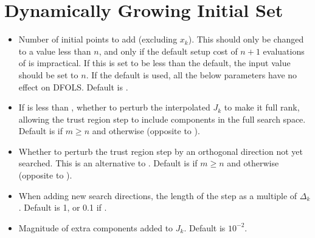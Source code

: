\documentclass[letterpaper,10pt,english]{sphinxmanual}
\begin{document}
\section{Dynamically Growing Initial Set}
\label{\detokenize{advanced:dynamically-growing-initial-set}}\begin{itemize}
\item {} 
 \sphinxhyphen{} Number of initial points to add (excluding \(x_k\)). This should only be changed to a value less than \(n\), and only if the default setup cost of \(n+1\) evaluations of  is impractical. If this is set to be less than the default, the input value  should be set to \(n\). If the default is used, all the below parameters have no effect on DFO\sphinxhyphen{}LS. Default is .

\item {} 
 \sphinxhyphen{} If  is less than , whether to perturb the interpolated \(J_k\) to make it full rank, allowing the trust region step to include components in the full search space. Default is  if \(m\geq n\) and  otherwise (opposite to ).

\item {} 
 \sphinxhyphen{} Whether to perturb the trust region step by an orthogonal direction not yet searched. This is an alternative to . Default is  if \(m\geq n\) and  otherwise (opposite to ).

\item {} 
 \sphinxhyphen{} When adding new search directions, the length of the step as a multiple of \(\Delta_k\). Default is 1, or 0.1 if .

\item {} 
 \sphinxhyphen{} Magnitude of extra components added to \(J_k\). Default is \(10^{-2}\).


\end{itemize}
\end{document}

